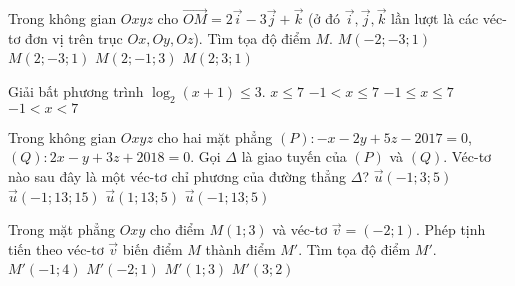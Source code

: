 \begin{ex}%
Trong không gian $Oxyz$ cho $\vec{OM}=2\vec{i}-3\vec{j}+\vec{k}$ (ở đó $\vec{i}, \vec{j}, \vec{k}$ lần lượt là các véc-tơ đơn vị trên trục $Ox, Oy, Oz$). Tìm tọa độ điểm $M$.
\choice
{$M(-2;-3;1)$}
{\True $M(2;-3;1)$}
{$M(2;-1;3)$}
{$M(2;3;1)$}
\end{ex}

\begin{ex}%
Giải bất phương trình $\log_2(x+1)\leq 3$.
\choice
{$x\leq 7$}
{\True $-1<x\leq 7$}
{$-1\leq x\leq 7$}
{$-1<x<7$}
\end{ex}

\begin{ex}%
Trong không gian $Oxyz$ cho hai mặt phẳng $(P)\colon -x-2y+5z-2017=0$, $(Q)\colon 2x-y+3z+2018=0$. Gọi $\Delta$ là giao tuyến của $(P)$ và $(Q)$. Véc-tơ nào sau đây là một véc-tơ chỉ phương của đường thẳng $\Delta$?
\choice
{$\vec{u}(-1;3;5)$}
{$\vec{u}(-1;13;15)$}
{$\vec{u}(1;13;5)$}
{\True $\vec{u}(-1;13;5)$}
\end{ex}

\begin{ex}%
Trong mặt phẳng $Oxy$ cho điểm $M(1;3)$ và véc-tơ $\vec{v}=(-2;1)$. Phép tịnh tiến theo véc-tơ $\vec{v}$ biến điểm $M$ thành điểm $M'$. Tìm tọa độ điểm $M'$.
\choice
{\True $M'(-1;4)$}
{$M'(-2;1)$}
{$M'(1;3)$}
{$M'(3;2)$}
\end{ex}

